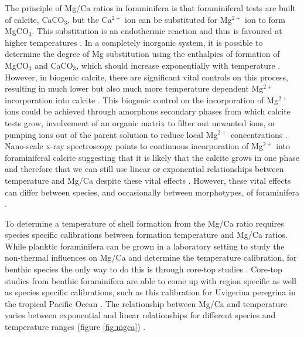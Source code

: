 The principle of Mg/Ca ratios in foraminifera is that foraminiferal tests are built of calcite, CaCO$_3$, but the Ca$^{2+}$ ion can be substituted for Mg$^{2+}$ ion to form MgCO$_3$. This substitution is an endothermic reaction and thus is favoured at higher temperatures \citep{elstnerovaInitioStudyThermodynamic2010}. In a completely inorganic system, it is possible to determine the degree of Mg substitution using the enthalpies of formation of MgCO$_3$ and CaCO$_3$, which should increase exponentially with temperature \citep{rosenthalTemperatureControlIncorporation1997}. However, in biogenic calcite, there are significant vital controls on this process, resulting in much lower but also much more temperature dependent Mg$^{2+}$ incorporation into calcite \citep{martinQuaternaryDeepSea2002, bentovImpactBiomineralizationProcesses2006}. This biogenic control on the incorporation of Mg$^{2+}$ ions could be achieved through amorphous secondary phases from which calcite tests grow, involvement of an organic matrix to filter out unwanted ions, or pumping ions out of the parent solution to reduce local Mg$^{2+}$ concentrations \citep{bentovImpactBiomineralizationProcesses2006, erezSourceIonsBiomineralization2003}. Nano-scale x-ray spectroscopy points to continuous incorporation of Mg$^{2+}$ into foraminiferal calcite suggesting that it is likely that the calcite grows in one phase and therefore that we can still use linear or exponential relationships between temperature and Mg/Ca despite these vital effects \citep{bransonCoordinationMgForaminiferal2013}. However, these vital effects can differ between species, and occasionally between morphotypes, of foraminifera \citep{steinkeMgCaRatios2005, schmittSingleForaminiferaMg2019}.

To determine a temperature of shell formation from the Mg/Ca ratio requires species specific calibrations between formation temperature and Mg/Ca ratios. While planktic foraminifera can be grown in a laboratory setting \citep{grayNonthermalInfluencesMg2019} to study the non-thermal influences on Mg/Ca and determine the temperature calibration, for benthic species the only way to do this is through core-top studies \citep{lea14ElementalIsotopic2014}. Core-top studies from benthic foraminifera are able to come up with region specific as well as species specific calibrations, such as this calibration for Uvigerina peregrina in the tropical Pacific Ocean \citep{stirpeMgCaProxy2021}. The relationship between Mg/Ca and temperature varies between exponential and linear relationships for different species and temperature ranges (figure \ref{fig:mgca}) \citep{elderfieldCalibrationsBenthicForaminiferal2006}.


